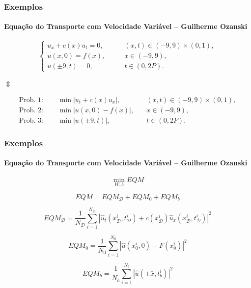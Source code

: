 \documentclass[usenames,dvipsnames,brazil,aspectratio=169]{beamer}
\begin{document}
\begin{frame}
    \frametitle{Exemplos}
    \framesubtitle{Equação do Transporte com Velocidade Variável -- Guilherme Ozanski}
    \begin{center}
        \begin{equation*}
            \left\{
                \begin{array}{ll}
                    u_x + c(x) u_t = 0, &\quad \quad(x,t) \in (-9,9) \times (0, 1),\\
                    u(x, 0) = f(x), &\quad \quad x \in (-9, 9),\\
                    u(\pm 9, t) = 0,  &\quad \quad t \in (0, 2P).
                \end{array}
            \right.
        \end{equation*}
    
        $\Updownarrow$ 
        
        \begin{equation*}
            \begin{array}{lll}
                \text{Prob. 1: }& \quad \min |u_t + c(x) u_x|, &\quad(x,t) \in (-9,9) \times (0, 1), \\
                \text{Prob. 2: }& \quad \min |u(x,0) - f(x)|, &\quad x \in (-9, 9), \\
                \text{Prob. 3: }& \quad \min |u(\pm 9, t)|, &\quad t \in (0, 2P).
            \end{array}
        \end{equation*}
    \end{center}
\end{frame}



\begin{frame}
    \frametitle{Exemplos}
    \framesubtitle{Equação do Transporte com Velocidade Variável -- Guilherme Ozanski}
\[\min_{W,b} EQM\]

\[EQM = EQM_\mathcal{D} + EQM_0 + EQM_b\]
    
\begin{equation*}
EQM_\mathcal{D} = \frac{1}{N_\mathcal{D}}\sum_{i = 1}^{N_\mathcal{D}}|\hat{u}_t(x_\mathcal{D}^i,t_\mathcal{D}^i) + c(x_\mathcal{D}^i) \hat{u}_x(x_\mathcal{D}^i,t_\mathcal{D}^i)|^2
    \end{equation*}

\begin{equation*}
    EQM_0 = \frac{1}{N_0}\sum_{i = 1}^{N_0}|\hat{u}(x_0^i,0)-F(x_0^i)|^2
\end{equation*}

\begin{equation*}
    EQM_b = \frac{1}{N_b}\sum_{i = 1}^{N_b}|\hat{u}(\pm \bar{x}, t_b^i)|^2
\end{equation*}

\end{frame}
\end{document}

